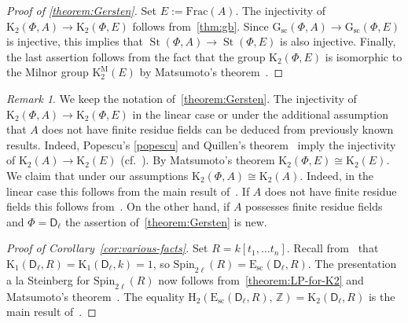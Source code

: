 \documentclass[oneside, 11pt]{amsart}
\numberwithin{equation}{section}
\newcommand{\K}{{\mathrm{K}}}
\newcommand{\St}{\mathop{\mathrm{St}}\nolimits}
\newcommand{\E}{\mathrm{E}}
\theoremstyle{definition}
\theoremstyle{definition}
\theoremstyle{remark}
\newtheorem{rem}[lemma]{Remark}
\newcommand{\rD}{\mathsf{D}}
\begin{document}
\begin{proof}[Proof of \cref{theorem:Gersten}]
  Set $E := \mathrm{Frac}(A)$. The injectivity of $\K_2(\Phi, A) \to \K_2(\Phi, E)$ follows from~\cref{thm:gb}. Since $\mathrm{G}_\mathrm{sc}(\Phi, A) \to \mathrm{G}_\mathrm{sc}(\Phi, E)$ is injective, this implies that $\St(\Phi, A) \to \St(\Phi, E)$ is also injective. Finally, the last assertion follows from the fact that the group $\K_2(\Phi, E)$ is isomorphic to the Milnor group $\K_2^\mathrm{M}(E)$ by Matsumoto's theorem~\cite[Theorem~5.10]{Ma69}.
\end{proof}

\begin{rem}\label{rem:many-units}
We keep the notation of~\cref{theorem:Gersten}. The injectivity of $\K_2(\Phi, A) \to \K_2(\Phi, E)$ in the linear case or under the additional assumption that $A$ does not have finite residue fields can be deduced from previously known results. Indeed, Popescu's \cref{popescu} and Quillen's theorem~\cite[Theorem~V.9.6]{Kbook} imply the injectivity of $\K_2(A) \to \K_2(E)$ (cf.~\cite[Theorem~A]{Pa03}). By Matsumoto's theorem $\K_2(\Phi, E) \cong \K_2(E)$. We claim that under our assumptions $\K_2(\Phi, A) \cong \K_2(A)$. Indeed, in the linear case this follows from the main result of~\cite{ST81}. If $A$ does not have finite residue fields this follows from~\cite[Example~1.5d and Theorem~3.7]{vdK77}. On the other hand, if $A$ possesses finite residue fields and $\Phi=\rD_\ell$ the assertion of~\cref{theorem:Gersten} is new.\end{rem}


\begin{proof}[Proof of Corollary~\ref{cor:various-facts}]
  Set $R = k[t_1,\ldots t_n]$. Recall from~\cite{Abe83} that $\K_1(\rD_\ell, R) = \K_1(\rD_\ell, k) = 1$, so $\mathrm{Spin}_{2\ell}(R) = \E_\mathrm{sc}(\rD_\ell, R)$. The presentation a la Steinberg for $\mathrm{Spin}_{2\ell}(R)$ now follows from~\cref{theorem:LP-for-K2} and Matsumoto's theorem~\cite[Theorem~5.10]{Ma69}. The equality $\mathrm H_2(\E_\mathrm{sc}(\rD_\ell, R),\,\mathbb Z) = \K_2(\rD_\ell, R)$ is the main result of~\cite{LS17}. \end{proof}
 
\end{document}
